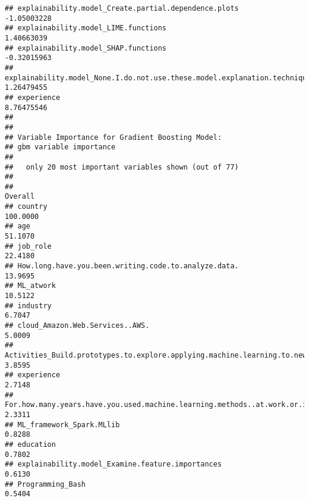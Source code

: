 \documentclass[
]{article}
\begin{document}
\begin{verbatim}
## explainability.model_Create.partial.dependence.plots                                                                        -1.05003228
## explainability.model_LIME.functions                                                                                          1.40663039
## explainability.model_SHAP.functions                                                                                         -0.32015963
## explainability.model_None.I.do.not.use.these.model.explanation.techniques                                                    1.26479455
## experience                                                                                                                   8.76475546
## 
## 
## Variable Importance for Gradient Boosting Model:
## gbm variable importance
## 
##   only 20 most important variables shown (out of 77)
## 
##                                                                                                             Overall
## country                                                                                                    100.0000
## age                                                                                                         51.1070
## job_role                                                                                                    22.4180
## How.long.have.you.been.writing.code.to.analyze.data.                                                        13.9695
## ML_atwork                                                                                                   10.5122
## industry                                                                                                     6.7047
## cloud_Amazon.Web.Services..AWS.                                                                              5.0009
## Activities_Build.prototypes.to.explore.applying.machine.learning.to.new.areas                                3.8595
## experience                                                                                                   2.7148
## For.how.many.years.have.you.used.machine.learning.methods..at.work.or.in.school..                            2.3311
## ML_framework_Spark.MLlib                                                                                     0.8288
## education                                                                                                    0.7802
## explainability.model_Examine.feature.importances                                                             0.6130
## Programming_Bash                                                                                             0.5404

\end{verbatim}
\end{document}
